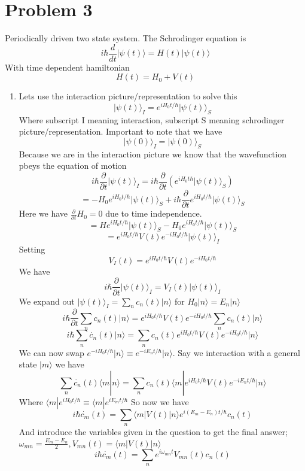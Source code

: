 \documentclass[12pt]{article}
\newcommand{\ket}[1]{\vert{#1}\rangle}
\begin{document}
\section*{Problem 3} 
Periodically driven two state system. The Schrodinger equation is 
$$ i \hbar \frac{d}{dt} \ket{\psi (t) } = H(t) \ket{\psi (t)} $$
With time dependent hamiltonian 
$$ H(t) = H_0 + V(t) $$
\begin{enumerate}
    \item Lets use the interaction picture/representation to solve this
    $$ \ket{\psi (t) } _I = e^{i H_0 t / \hbar} \ket{\psi (t) } _S $$ 
    Where subscript I meaning interaction, subscript S meaning schrodinger picture/representation. Important to note that we have 
    $$ \ket{\psi (0) }_I = \ket{ \psi (0)}_S $$
    Because we are in the interaction picture we know that the wavefunction pbeys the equation of motion 
    $$ i \hbar \frac{ \partial}{\partial t} \ket{\psi (t)}_I = i \hbar \frac{\partial}{\partial t} ( e^{i H_0 t \hbar} \ket{\psi (t)}_S ) $$ 
    $$ = - H_0 e^{i H_0 t/ \hbar} \ket{ \psi (t) }_S + i \hbar \frac{\partial}{\partial t} e^{i H_0 t / \hbar} \ket{\psi (t)}_S $$
    Here we have $\frac{\partial}{\partial t} H_0 = 0$ due to time independence. 
    $$ = H e^{i H_0 t / \hbar} \ket{\psi (t)}_S - H_0 e^{i H_0 t / \hbar} \ket{ \psi (t)}_S $$
    $$ = e^{i H_0 t / \hbar} V (t) e^{-i H_0 t / \hbar} \ket{\psi (t) }_I $$
    Setting 
    $$ V_I (t) = e^{i H_0 t / \hbar} V (t) e^{-i H_0 t / \hbar} $$
    We have 
    $$ i \hbar \frac{\partial}{\partial t} \ket{\psi (t)}_I = V_I (t) \ket{\psi (t)}_I $$
    We expand out $\ket{\psi (t)}_I = \sum_n c_n (t) \ket{n} $ for $H_0 \ket{n} = E_n \ket{n}$ 
    $$ i \hbar \frac{ \partial}{\partial t} \sum_n c_n (t) \ket{n} = e^{i H_0 t / \hbar} V(t) e^{-i H_0 t / \hbar} \sum_n c_n (t) \ket{n} $$
    $$ i \hbar \sum_n \dot{c_n} (t) \ket{n} = \sum_n c_n (t) e^{i H_0 t / \hbar} V(t) e^{-i H_0 t / \hbar} \ket{n} $$
    We can now swap $e^{-i H_0 t / \hbar} \ket{n} \equiv e^{-i E_n t / \hbar} \ket{n} $. Say we interaction with a general state $\ket{m}$ we have 
    $$ \sum_n \dot{c_n} (t) \langle m | n \rangle = \sum_n c_n (t) \langle m | e^{i H_0 t / \hbar} V (t) e^{-i E_n t / \hbar} | n \rangle $$
    Where $\langle m | e^{i H_0 t / \hbar} \equiv \langle m | e^{i E_m t / \hbar}$
    So now we have 
    $$ i \hbar \dot{c_m} (t) = \sum_n \langle m | V(t) | n \rangle e^{i (E_m - E_n) t / \hbar} c_n (t) $$
    And introduce the variables given in the question to get the final answer; $\omega_{mn} = \frac{E_m - E_n}{2}, V_{mn} (t) = \langle m | V(t) | n \rangle$ 
    $$ i \hbar \dot{c_m} (t) = \sum_n e^{i \omega_{mn} t} V_{mn} (t) c_n (t) $$


\end{enumerate}
\end{document}
